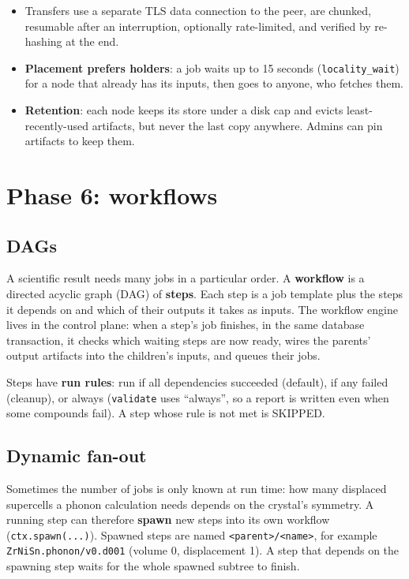 \documentclass[11pt,a4paper]{report}
\newcommand{\code}[1]{\texttt{#1}}
\begin{document}
\begin{itemize}
\item Transfers use a separate TLS data connection to the peer, are chunked, resumable after an
  interruption, optionally rate-limited, and verified by re-hashing at the end.
\item \textbf{Placement prefers holders}: a job waits up to 15 seconds (\code{locality\_wait})
  for a node that already has its inputs, then goes to anyone, who fetches them.
\item \textbf{Retention}: each node keeps its store under a disk cap and evicts least-recently-used
  artifacts, but never the last copy anywhere. Admins can pin artifacts to keep them.
\end{itemize}

\chapter{Phase 6: workflows}

\section{DAGs}

A scientific result needs many jobs in a particular order. A \textbf{workflow} is a directed
acyclic graph (DAG) of \textbf{steps}. Each step is a job template plus the steps it depends on and
which of their outputs it takes as inputs. The workflow engine lives in the control plane: when a
step's job finishes, in the same database transaction, it checks which waiting steps are now
ready, wires the parents' output artifacts into the children's inputs, and queues their jobs.

Steps have \textbf{run rules}: run if all dependencies succeeded (default), if any failed (cleanup),
or always (\code{validate} uses ``always'', so a report is written even when some compounds fail).
A step whose rule is not met is SKIPPED.

\section{Dynamic fan-out}

Sometimes the number of jobs is only known at run time: how many displaced supercells a phonon
calculation needs depends on the crystal's symmetry. A running step can therefore \textbf{spawn}
new steps into its own workflow (\code{ctx.spawn(...)}). Spawned steps are named
\code{<parent>/<name>}, for example \code{ZrNiSn.phonon/v0.d001} (volume 0, displacement 1). A step
that depends on the spawning step waits for the whole spawned subtree to finish.
\end{document}
